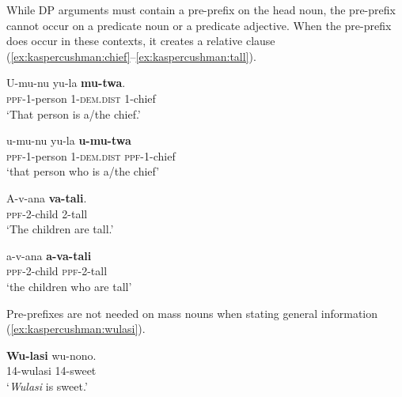 \documentclass[output=paper,modfonts,nonflat]{langsci/langscibook}
\begin{document}
\begin{exe}
\end{exe}

While DP arguments must contain a pre-prefix on the head noun, the pre-prefix cannot occur on a predicate noun or a predicate adjective. When the pre-prefix does occur in these contexts, it creates a relative clause (\ref{ex:kaspercushman:chief}--\ref{ex:kaspercushman:tall}). 

\begin{exe}
\ex \label{ex:kaspercushman:chief} \begin{xlist}

\ex 
\gll U-mu-nu yu-la \textbf{mu-twa}. \\
\textsc{ppf}-1-person 1-\textsc{dem.dist} 1-chief \\
\glt `That person is a/the chief.'


\ex 
\gll u-mu-nu yu-la \textbf{u-mu-twa} \\
\textsc{ppf}-1-person 1-\textsc{dem.dist} \textsc{ppf}-1-chief \\
\glt `that person who is a/the chief'

\end{xlist}
\end{exe}

\begin{exe}

\ex \label{ex:kaspercushman:tall} \begin{xlist}

\ex 
\gll A-v-ana \textbf{va-tali}. \\
\textsc{ppf}-2-child 2-tall  \\
\glt `The children are tall.'


\ex 
\gll a-v-ana \textbf{a-va-tali} \\
\textsc{ppf}-2-child \textsc{ppf}-2-tall \\
\glt `the children who are tall'

\end{xlist}
\end{exe}

Pre-prefixes are not needed on mass nouns when stating general information (\ref{ex:kaspercushman:wulasi}). 


\begin{exe}

\ex \label{ex:kaspercushman:wulasi} 
\gll \textbf{Wu-lasi} wu-nono. \\
14-wulasi 14-sweet \\
\glt `\textit{Wulasi} is sweet.'

\end{exe}
\end{document}

